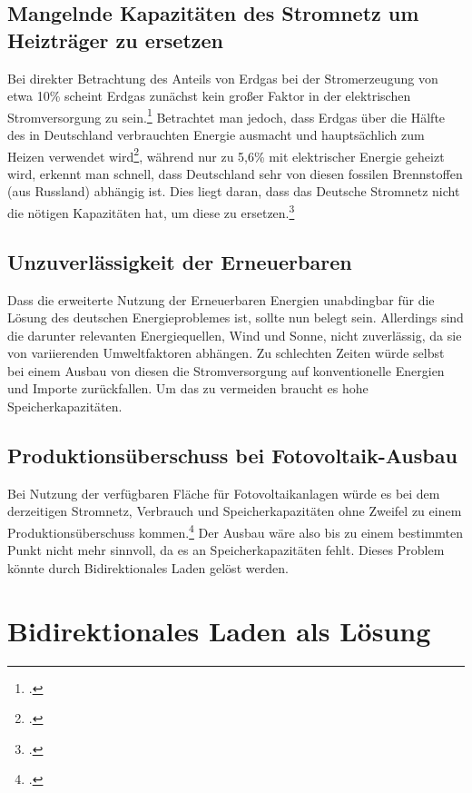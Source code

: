 \documentclass[12pt]{article}
\begin{document}
\subsection{Mangelnde Kapazitäten des Stromnetz um Heizträger zu ersetzen}
Bei direkter Betrachtung des Anteils von Erdgas bei der Stromerzeugung von etwa 10\% scheint Erdgas zunächst
kein großer Faktor in der elektrischen Stromversorgung zu sein.\footcite{SMARDHoherEEAnteil, EnergieWofurErdgas}
Betrachtet man jedoch, dass Erdgas über die Hälfte des in Deutschland verbrauchten
Energie ausmacht und hauptsächlich zum Heizen verwendet wird\footcite{Anwendungsbereiche, EnergieWofurErdgas},
während nur zu 5,6\% mit elektrischer Energie geheizt wird, erkennt man schnell, dass Deutschland sehr von diesen
fossilen Brennstoffen (aus Russland) abhängig ist.
Dies liegt daran, dass das Deutsche Stromnetz nicht die nötigen Kapazitäten hat, um diese zu
ersetzen.\footcite{EnergieWofurErdgas}

\subsection{Unzuverlässigkeit der Erneuerbaren}
Dass die erweiterte Nutzung der Erneuerbaren Energien unabdingbar für die Lösung des deutschen Energieproblemes
ist, sollte nun belegt sein. Allerdings sind die darunter relevanten Energiequellen, Wind und Sonne, nicht
zuverlässig, da sie von variierenden Umweltfaktoren abhängen. Zu schlechten Zeiten würde selbst bei einem Ausbau
von diesen die Stromversorgung auf konventionelle Energien und Importe zurückfallen. Um das zu vermeiden braucht
es hohe Speicherkapazitäten.

\subsection{Produktionsüberschuss bei Fotovoltaik-Ausbau}
Bei Nutzung der verfügbaren Fläche für Fotovoltaikanlagen würde es bei dem derzeitigen Stromnetz, Verbrauch und
Speicherkapazitäten ohne Zweifel zu einem Produktionsüberschuss kommen.\footcite{wirthAktuelleFaktenZur}
Der Ausbau wäre also bis zu einem bestimmten Punkt nicht mehr sinnvoll, da es an Speicherkapazitäten fehlt.
Dieses Problem könnte durch Bidirektionales Laden gelöst werden.


\section{Bidirektionales Laden als Lösung}
\end{document}
